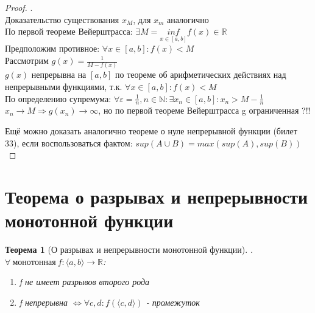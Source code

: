 \documentclass[11pt,a4paper,titlepage]{article}
\newtheorem*{theorem}{Теорема}
\renewcommand{\inf}[1]{\underset{#1}{inf}}
\renewcommand{\implies}{\Rightarrow}
\renewcommand{\iff}{\Leftrightarrow}
\renewcommand{\epsilon}{\varepsilon}
\newcommand{\interval}[1]{\langle#1\rangle}
\newcommand{\R}{\mathbb{R}}
\newcommand{\N}{\mathbb{N}}
\begin{document}
    \begin{proof}
        .\\
        Доказательство существования $x_M$, для $x_m$ аналогично\\
        По первой теореме Вейерштрасса: $\exists M = \inf{x\in[a,b]}f(x) \in \R$\\
        Предположим противное: $\forall x \in [a,b]: f(x) < M$\\
        Рассмотрим $g(x) = \frac{1}{M-f(x)}$\\
        $g(x)$ непрерывна на $[a,b]$ по теореме об арифметических действиях над непрерывными функциями, т.к. $\forall x \in [a,b]: f(x) < M$\\
        По определению супремума: $\forall \epsilon = \frac{1}{n}, n\in\N: \exists x_n \in [a,b]: x_n > M - \frac{1}{n}$\\
        $x_n \to M \implies g(x_n) \to \infty$, но по первой теореме Вейерштрасса g ограниченная ?!!

        Ещё можно доказать аналогично теореме о нуле непрерывной функции (билет 33), если воспользоваться фактом: $sup(A \cup B) = max(sup(A), sup(B))$
    \end{proof}


    \section{Теорема о разрывах и непрерывности монотонной функции}

    \begin{theorem}[О разрывах и непрерывности монотонной функции]
        .\\
        $\forall\ монотонная\ f: \interval{a,b}\to\R$:
        \begin{enumerate}
            \item f не имеет разрывов второго рода
            \item f непрерывна $\iff \forall c,d: f(\interval{c,d})$ - промежуток
        \end{enumerate}
    \end{theorem}
\end{document}
